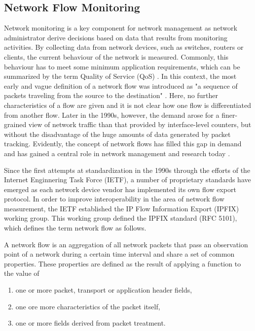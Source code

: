 \subsection{Network Flow Monitoring}\label{subsec:network_flow_monitoring}

Network monitoring is a key component for network management as network administrator derive decisions based on data that results from monitoring activities. By collecting data from network devices, such as switches, routers or clients, the current behaviour of the network is measured. Commonly, this behaviour has to meet some minimum application requirements, which can be summarized by the term Quality of Service (QoS) \cite[406]{tanenbaum2021computer}. In this context, the most early and vague definition of a network flow was introduced as "a sequence of packets traveling from the source to the destination" \cite{clark1988design}. Here, no further characteristics of a flow are given and it is not clear how one flow is differentiated from another flow. Later in the 1990s, however, the demand arose for a finer-grained view of network traffic than that provided by interface-level counters, but without the disadvantage of the huge amounts of data generated by packet tracking. Evidently, the concept of network flows has filled this gap in demand and has gained a central role in network management and research today \cite{trammell2011introduction}.

Since the first attempts at standardization in the 1990s through the efforts of the Internet Enginnering Task Force (IETF), a number of proprietary standards have emerged as each network device vendor has implemented its own flow export protocol. In order to improve interoperability in the area of network flow measurement, the IETF established the IP Flow Information Export (IPFIX) working group. This working group defined the IPFIX standard (RFC 5101), which defines the term network flow as follows.

A network flow is an aggregation of all network packets that pass an observation point of a network during a certain time interval and share a set of common properties. These properties are defined as the result of applying a function to the value of
\begin{enumerate}
    \item one or more packet, transport or application header fields,
    \item one ore more characteristics of the packet itself,
    \item one or more fields derived from packet treatment.
\end{enumerate}

